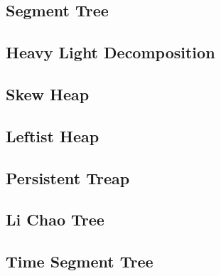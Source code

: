 \documentclass[a4paper,10pt,twocolumn,oneside]{article}
\begin{document}
\subsection{Segment Tree}


%

\subsection{Heavy Light Decomposition}


%

\subsection{Skew Heap}


\subsection{Leftist Heap}


\subsection{Persistent Treap}


\subsection{Li Chao Tree}


\subsection{Time Segment Tree}

\end{document}
